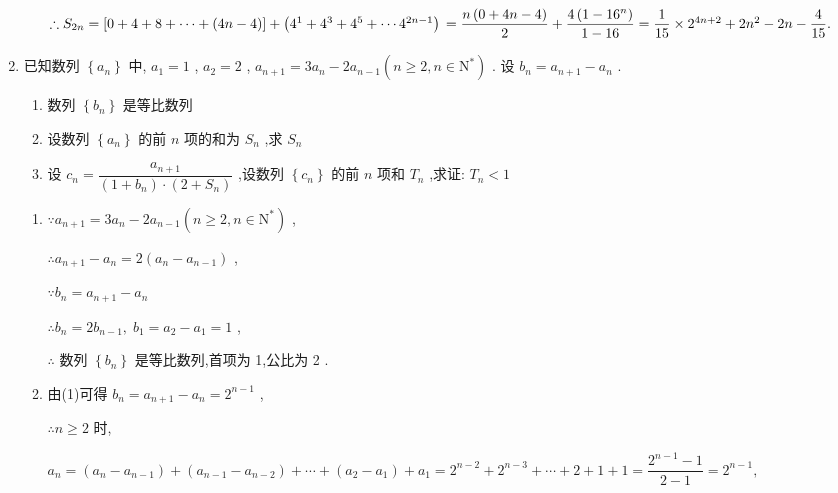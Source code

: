 \begin{enumerate}
\begin{jieda}
\begin{enumerate}
            $\therefore {S}_{2n} = \left\lbrack  {0 + 4 + 8 + \cdots  + \left( {{4n} - 4}\right) }\right\rbrack   + \left( {{4}^{1} + {4}^{3} + {4}^{5} + \cdots {4}^{{2n} - 1}}\right)\\
            = \dfrac{n\left( {0 + {4n} - 4}\right) }{2} + \dfrac{4\left( {1 - {16}^{n}}\right) }{1 - {16}}
            = \dfrac{1}{15} \times  {2}^{{4n} + 2} + 2{n}^{2} - {2n} - \dfrac{4}{15}.$
        \end{enumerate}
    \end{jieda}
    \item 已知数列 $\left\{  {a}_{n}\right\}$ 中, ${a}_{1} = 1$ , ${a}_{2} = 2$ , ${a}_{n + 1} = 3{a}_{n} - 2{a}_{n - 1}\left( {n \geq  2,n \in  {\mathrm{N}}^{ * }}\right)$ . 设 ${b}_{n} = {a}_{n + 1} - {a}_{n}$ .
    \begin{enumerate}
        \item 数列 $\left\{  {b}_{n}\right\}$ 是等比数列
        \item 设数列 $\left\{  {a}_{n}\right\}$ 的前 $n$ 项的和为 ${S}_{n}$ ,求 ${S}_{n}$
        \item 设 ${c}_{n} = \dfrac{{a}_{n + 1}}{\left( {1 + {b}_{n}}\right)  \cdot  \left( {2 + {S}_{n}}\right) }$ ,设数列 $\left\{  {c}_{n}\right\}$ 的前 $n$ 项和 ${T}_{n}$ ,求证: ${T}_{n} < 1$
    \end{enumerate}
    \begin{jieda}
        \begin{enumerate}
            \item $\because {a}_{n + 1} = 3{a}_{n} - 2{a}_{n - 1}\left( {n \geq  2,n \in  {\mathrm{N}}^{ * }}\right)$ ,
                
                $\therefore {a}_{n + 1} - {a}_{n} = 2\left( {{a}_{n} - {a}_{n - 1}}\right)$ ,
                
                $\because {b}_{n} = {a}_{n + 1} - {a}_{n}$
                
                $\therefore {b}_{n} = 2{b}_{n - 1},\;{b}_{1} = {a}_{2} - {a}_{1} = 1$ ,
                
                $\therefore$ 数列 $\left\{  {b}_{n}\right\}$ 是等比数列,首项为 1,公比为 2 .
            \item 由(1)可得 ${b}_{n} = {a}_{n + 1} - {a}_{n} = {2}^{n - 1}$ ,
            
            $\therefore n \geq  2$ 时,
            
            ${a}_{n} = \left( {{a}_{n} - {a}_{n - 1}}\right)  + \left( {{a}_{n - 1} - {a}_{n - 2}}\right)  + \cdots  + \left( {{a}_{2} - {a}_{1}}\right)  + {a}_{1} = {2}^{n - 2} + {2}^{n - 3} + \cdots  + 2 + 1 + 1 = \dfrac{{2}^{n - 1} - 1}{2 - 1} = {2}^{n - 1},$
            

\end{enumerate}
\end{jieda}
\end{enumerate}

